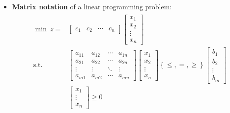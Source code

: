 \documentclass[english]{article}
\begin{document}
\begin{itemize}
  \item \textbf{Matrix notation} of a linear programming problem:
        \begin{gather*}
          \begin{aligned}
            \min \          z = & \begin{bmatrix}
                                    c_1 & c_2 & \cdots & c_n
                                  \end{bmatrix}
            \begin{bmatrix}
              x_1 \\ x_2 \\ \vdots \\ x_n
            \end{bmatrix}                                                        \\
            \text{s.t.} \       & \begin{bmatrix}
                                    a_{11} & a_{12} & \cdots & a_{1n} \\
                                    a_{21} & a_{22} & \cdots & a_{2n} \\
                                    \vdots & \vdots & \ddots & \vdots \\
                                    a_{m1} & a_{m2} & \cdots & a_{mn}
                                  \end{bmatrix}
            \begin{bmatrix}
              x_1 \\ x_2 \\ \vdots \\ x_n
            \end{bmatrix} \left\{ \leq, =, \geq \right\}
            \begin{bmatrix}
              b_1 \\ b_2 \\ \vdots \\ b_m \end{bmatrix}                                          \\
                                & \begin{bmatrix} x_1 \\ \vdots \\ x_n \end{bmatrix}
            \geq 0
          \end{aligned}
        \end{gather*}
\end{itemize}
\end{document}
